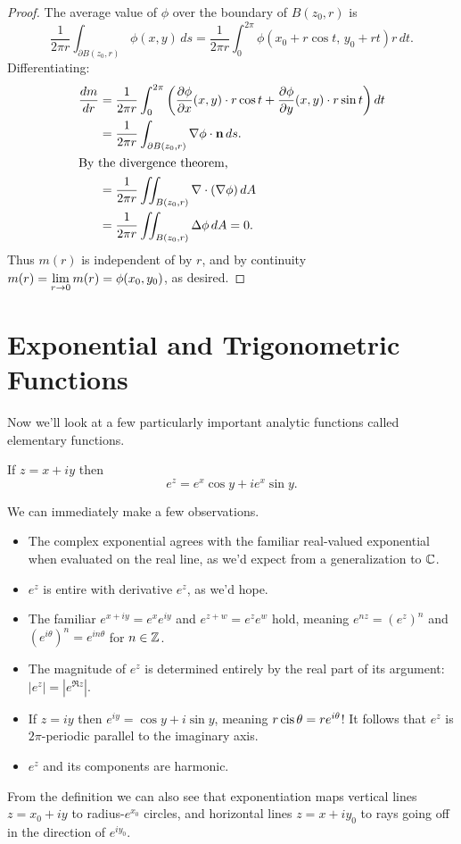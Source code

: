 \documentclass[../m136main.tex]{subfiles}
\begin{document}
\begin{proof}
    The average value of $\phi$ over the boundary of $B(z_0, r)$ is
    \[ \frac{1}{2\pi r} \int_{\partial B(z_0, r)} \phi(x,y) \,ds = \frac{1}{2\pi r} \int_{0}^{2\pi} \phi(x_0 + r \cos t, \, y_0 + r  t) r \,dt. \]
    Differentiating:
    \begin{align*}
        \frac{dm}{dr} &= \frac{1}{2\pi r} \int_{0}^{2\pi} \left( \frac{\partial \phi}{\partial x} (x,y) \cdot r \cos t + \frac{\partial \phi}{\partial y} (x,y) \cdot r \sin t \right) dt \\
        &= \frac{1}{2\pi r} \int_{\partial B(z_0, r)} \nabla \phi \cdot \mathbf{n} \,ds. \\
        \intertext{By the divergence theorem,}
        &= \frac{1}{2\pi r} \iint_{B(z_0, r)} \nabla \cdot (\nabla \phi) \, dA \\
        &= \frac{1}{2\pi r} \iint_{B(z_0, r)} \Delta \phi \, dA = 0.
    \end{align*}
    Thus $m(r)$ is independent of by $r$, and by continuity $\displaystyle m(r) = \lim_{r \to 0} m(r) = \phi(x_0, y_0)$, as desired.
\end{proof}

\section{Exponential and Trigonometric Functions}
Now we'll look at a few particularly important analytic functions called elementary functions.

\begin{definition}
    If $z = x + iy$ then
    \[ e^{z} = e^{x} \cos y + i e^{x} \sin y. \]
\end{definition}

We can immediately make a few observations.
\begin{itemize}[topsep=0pt]
    \item The complex exponential agrees with the familiar real-valued exponential when evaluated on the real line, as we'd expect from a generalization to $\mathbb{C}$.
    \item $e^{z}$ is entire with derivative $e^{z}$, as we'd hope.
    \item The familiar $e^{x + iy} = e^{x} e^{iy}$ and $e^{z+w} = e^{z} e^{w}$ hold, meaning $e^{nz} = (e^{z})^{n}$ and $(e^{i\theta})^n = e^{in\theta}$ for $n \in \mathbb{Z}$.
    \item The magnitude of $e^{z}$ is determined entirely by the real part of its argument: $|e^{z}| = |e^{\Re z}|$.
    \item If $z = iy$ then $e^{iy} = \cos y + i \sin y$, meaning $r \operatorname{cis} \theta = r e^{i\theta}$!
    It follows that $e^{z}$ is $2\pi$-periodic parallel to the imaginary axis.
    \item $e^{z}$ and its components are harmonic.
\end{itemize}
From the definition we can also see that exponentiation maps vertical lines $z = x_0 + iy$ to radius-$e^{x_0}$ circles, and horizontal lines $z = x + iy_0$ to rays going off in the direction of $e^{iy_0}$.
\end{document}

